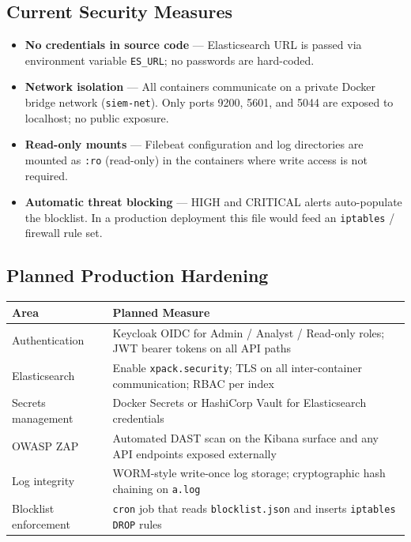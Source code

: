 \documentclass[12pt,a4paper]{article}
\newcommand{\file}[1]{\texttt{\color{accent}#1}}
\begin{document}
\subsection{Current Security Measures}

\begin{itemize}[leftmargin=2em]
  \item \textbf{No credentials in source code} — Elasticsearch URL is
        passed via environment variable \texttt{ES\_URL}; no passwords are
        hard-coded.
  \item \textbf{Network isolation} — All containers communicate on a private
        Docker bridge network (\texttt{siem-net}). Only ports 9200, 5601, and
        5044 are exposed to localhost; no public exposure.
  \item \textbf{Read-only mounts} — Filebeat configuration and log directories
        are mounted as \texttt{:ro} (read-only) in the containers where write
        access is not required.
  \item \textbf{Automatic threat blocking} — HIGH and CRITICAL alerts
        auto-populate the blocklist. In a production deployment this file would
        feed an \texttt{iptables} / firewall rule set.
\end{itemize}

\subsection{Planned Production Hardening}

\begin{center}
\begin{tabular}{p{4cm}p{9cm}}
  \toprule
  \textbf{Area} & \textbf{Planned Measure} \\
  \midrule
  Authentication     & Keycloak OIDC for Admin / Analyst / Read-only roles; JWT bearer tokens on all API paths \\
  Elasticsearch      & Enable \texttt{xpack.security}; TLS on all inter-container communication; RBAC per index \\
  Secrets management & Docker Secrets or HashiCorp Vault for Elasticsearch credentials \\
  OWASP ZAP          & Automated DAST scan on the Kibana surface and any API endpoints exposed externally \\
  Log integrity      & WORM-style write-once log storage; cryptographic hash chaining on \file{a.log} \\
  Blocklist enforcement & \texttt{cron} job that reads \file{blocklist.json} and inserts \texttt{iptables DROP} rules \\
  \bottomrule
\end{tabular}
\end{center}
\end{document}
